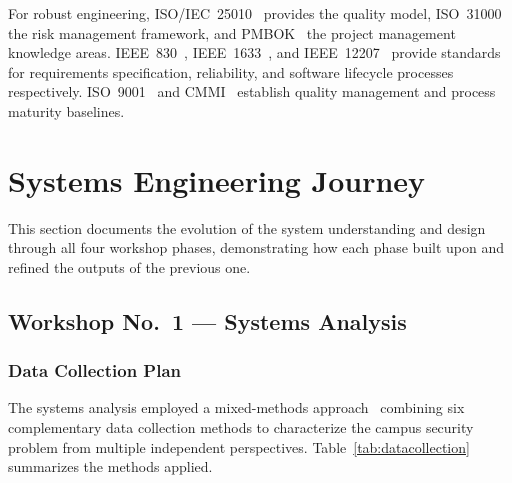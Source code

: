 \documentclass[11pt,a4paper]{article}
\begin{document}
For robust engineering, ISO/IEC~25010~\cite{iso25010} provides the quality model, ISO~31000~\cite{iso31000} the risk management framework, and PMBOK~\cite{pmbok2021} the project management knowledge areas. IEEE~830~\cite{ieee830}, IEEE~1633~\cite{ieee1633}, and IEEE~12207~\cite{ieee12207} provide standards for requirements specification, reliability, and software lifecycle processes respectively. ISO~9001~\cite{iso9001} and CMMI~\cite{cmmi2018} establish quality management and process maturity baselines.


\section{Systems Engineering Journey}

This section documents the evolution of the system understanding and design through all four workshop phases, demonstrating how each phase built upon and refined the outputs of the previous one.

\subsection{Workshop No.\ 1 --- Systems Analysis}

\subsubsection{Data Collection Plan}

The systems analysis employed a mixed-methods approach~\cite{creswell2018} combining six complementary data collection methods to characterize the campus security problem from multiple independent perspectives. Table~\ref{tab:datacollection} summarizes the methods applied.
\end{document}
